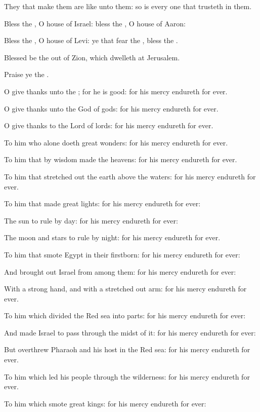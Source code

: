 \Verse They that make them are like unto them: so is every one that trusteth in them.

\Verse Bless the \LORD, O house of Israel: bless the \LORD, O house of Aaron:

\Verse Bless the \LORD, O house of Levi: ye that fear the \LORD, bless the \LORD.

\Verse Blessed be the \LORD out of Zion, which dwelleth at Jerusalem.

Praise ye the \LORD.




\Chapter
\Verse O give thanks unto the \LORD; for he is good: for his mercy endureth for ever.

\Verse O give thanks unto the God of gods: for his mercy endureth for ever.

\Verse O give thanks to the Lord of lords: for his mercy endureth for ever.

\Verse To him who alone doeth great wonders: for his mercy endureth for ever.

\Verse To him that by wisdom made the heavens: for his mercy endureth for ever.

\Verse To him that stretched out the earth above the waters: for his mercy endureth for ever.

\Verse To him that made great lights: for his mercy endureth for ever:

\Verse The sun to rule by day: for his mercy endureth for ever:

\Verse The moon and stars to rule by night: for his mercy endureth for ever.

\Verse To him that smote Egypt in their firstborn: for his mercy endureth for ever:

\Verse And brought out Israel from among them: for his mercy endureth for ever:

\Verse With a strong hand, and with a stretched out arm: for his mercy endureth for ever.

\Verse To him which divided the Red sea into parts: for his mercy endureth for ever:

\Verse And made Israel to pass through the midst of it: for his mercy endureth for ever:

\Verse But overthrew Pharaoh and his host in the Red sea: for his mercy endureth for ever.

\Verse To him which led his people through the wilderness: for his mercy endureth for ever.

\Verse To him which smote great kings: for his mercy endureth for ever:

